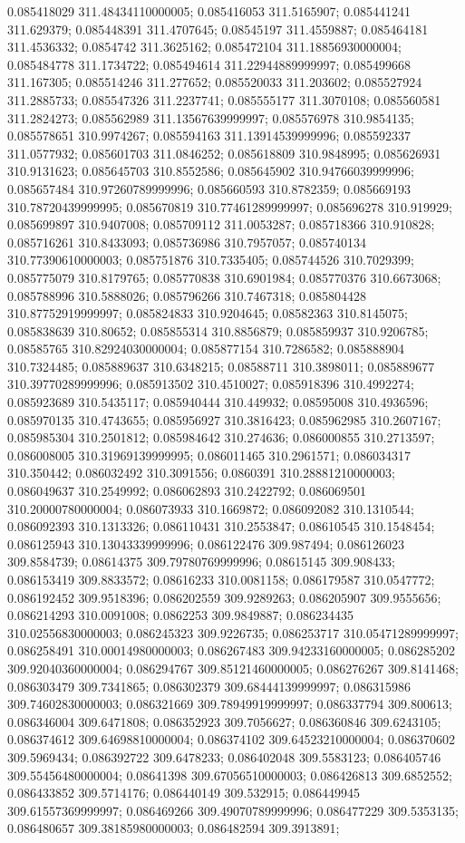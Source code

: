 0.085418029 311.48434110000005; 0.085416053 311.5165907; 0.085441241 311.629379; 0.085448391 311.4707645; 0.08545197 311.4559887; 0.085464181 311.4536332; 0.0854742 311.3625162; 0.085472104 311.18856930000004; 0.085484778 311.1734722; 0.085494614 311.22944889999997; 0.085499668 311.167305; 0.085514246 311.277652; 0.085520033 311.203602; 0.085527924 311.2885733; 0.085547326 311.2237741; 0.085555177 311.3070108; 0.085560581 311.2824273; 0.085562989 311.13567639999997; 0.085576978 310.9854135; 0.085578651 310.9974267; 0.085594163 311.13914539999996; 0.085592337 311.0577932; 0.085601703 311.0846252; 0.085618809 310.9848995; 0.085626931 310.9131623; 0.085645703 310.8552586; 0.085645902 310.94766039999996; 0.085657484 310.97260789999996; 0.085660593 310.8782359; 0.085669193 310.78720439999995; 0.085670819 310.77461289999997; 0.085696278 310.919929; 0.085699897 310.9407008; 0.085709112 311.0053287; 0.085718366 310.910828; 0.085716261 310.8433093; 0.085736986 310.7957057; 0.085740134 310.77390610000003; 0.085751876 310.7335405; 0.085744526 310.7029399; 0.085775079 310.8179765; 0.085770838 310.6901984; 0.085770376 310.6673068; 0.085788996 310.5888026; 0.085796266 310.7467318; 0.085804428 310.87752919999997; 0.085824833 310.9204645; 0.08582363 310.8145075; 0.085838639 310.80652; 0.085855314 310.8856879; 0.085859937 310.9206785; 0.08585765 310.82924030000004; 0.085877154 310.7286582; 0.085888904 310.7324485; 0.085889637 310.6348215; 0.08588711 310.3898011; 0.085889677 310.39770289999996; 0.085913502 310.4510027; 0.085918396 310.4992274; 0.085923689 310.5435117; 0.085940444 310.449932; 0.08595008 310.4936596; 0.085970135 310.4743655; 0.085956927 310.3816423; 0.085962985 310.2607167; 0.085985304 310.2501812; 0.085984642 310.274636; 0.086000855 310.2713597; 0.086008005 310.31969139999995; 0.086011465 310.2961571; 0.086034317 310.350442; 0.086032492 310.3091556; 0.0860391 310.28881210000003; 0.086049637 310.2549992; 0.086062893 310.2422792; 0.086069501 310.20000780000004; 0.086073933 310.1669872; 0.086092082 310.1310544; 0.086092393 310.1313326; 0.086110431 310.2553847; 0.08610545 310.1548454; 0.086125943 310.13043339999996; 0.086122476 309.987494; 0.086126023 309.8584739; 0.08614375 309.79780769999996; 0.08615145 309.908433; 0.086153419 309.8833572; 0.08616233 310.0081158; 0.086179587 310.0547772; 0.086192452 309.9518396; 0.086202559 309.9289263; 0.086205907 309.9555656; 0.086214293 310.0091008; 0.0862253 309.9849887; 0.086234435 310.02556830000003; 0.086245323 309.9226735; 0.086253717 310.05471289999997; 0.086258491 310.00014980000003; 0.086267483 309.94233160000005; 0.086285202 309.92040360000004; 0.086294767 309.85121460000005; 0.086276267 309.8141468; 0.086303479 309.7341865; 0.086302379 309.68444139999997; 0.086315986 309.74602830000003; 0.086321669 309.78949919999997; 0.086337794 309.800613; 0.086346004 309.6471808; 0.086352923 309.7056627; 0.086360846 309.6243105; 0.086374612 309.64698810000004; 0.086374102 309.64523210000004; 0.086370602 309.5969434; 0.086392722 309.6478233; 0.086402048 309.5583123; 0.086405746 309.55456480000004; 0.08641398 309.67056510000003; 0.086426813 309.6852552; 0.086433852 309.5714176; 0.086440149 309.532915; 0.086449945 309.61557369999997; 0.086469266 309.49070789999996; 0.086477229 309.5353135; 0.086480657 309.38185980000003; 0.086482594 309.3913891; 